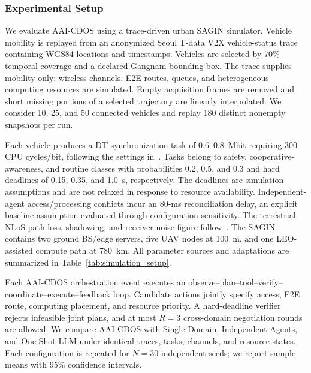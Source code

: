 \subsubsection{Experimental Setup}
We evaluate AAI-CDOS using a trace-driven urban SAGIN simulator. Vehicle
mobility is replayed from an anonymized Seoul T-data V2X vehicle-status trace
containing WGS84 locations and timestamps. Vehicles are selected by 70\%
temporal coverage and a declared Gangnam bounding box. The trace supplies mobility only;
wireless channels, E2E routes, queues, and heterogeneous computing resources
are simulated. Empty acquisition frames are removed and short missing portions
of a selected trajectory are linearly interpolated. We consider 10, 25, and 50
connected vehicles and replay 180 distinct nonempty snapshots per run.

Each vehicle produces a DT synchronization task of 0.6--0.8~Mbit requiring 300
CPU cycles/bit, following the settings in~\cite{li2025delayaware}. Tasks belong
to safety, cooperative-awareness, and routine classes with probabilities
0.2, 0.5, and 0.3 and hard deadlines of 0.15, 0.35, and 1.0~s, respectively.
The deadlines are simulation assumptions and are not relaxed in response to
resource availability. Independent-agent access/processing conflicts incur an
80-ms reconciliation delay, an explicit baseline assumption evaluated through
configuration sensitivity. The terrestrial NLoS path loss, shadowing, and receiver
noise figure follow~\cite{zhang2023digitaltwin}. The SAGIN contains two ground
BS/edge servers, five UAV nodes at 100~m, and one LEO-assisted compute path at
780~km. All parameter sources and adaptations are summarized in
Table~\ref{tab:simulation_setup}.

Each AAI-CDOS orchestration event executes an
observe--plan--tool--verify--coordinate--execute--feedback loop. Candidate
actions jointly specify access, E2E route, computing placement, and resource
priority. A hard-deadline verifier rejects infeasible joint plans, and at most
$R=3$ cross-domain negotiation rounds are allowed. We compare AAI-CDOS with
Single Domain, Independent Agents, and One-Shot LLM under identical traces,
tasks, channels, and resource states. Each configuration is repeated for
$N=30$ independent seeds; we report sample means with 95\% confidence
intervals.


